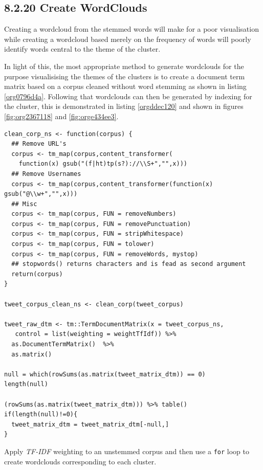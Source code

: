 \documentclass[11pt]{article}
\begin{document}
\subsection{8.2.20 Create WordClouds}
\label{sec:org598ae54}
Creating a wordcloud from the stemmed words will make for a poor visualisation
while creating a wordcloud based merely on the frequency of words will poorly
identify words central to the theme of the cluster.

In light of this, the most appropriate method to generate wordclouds for the
purpose visualisising the themes of the clusters is to create a document term
matrix based on a corpus cleaned without word stemming as shown in listing \ref{org0796d4a}.
Following that wordclouds can then be generated by indexing for the cluster,
this is demonstrated in listing \ref{orgddec120} and shown in figures \ref{fig:org2367118} and \ref{fig:orge434ee3}.


\begin{listing}[htbp]
\begin{verbatim}
clean_corp_ns <- function(corpus) {
  ## Remove URL's
  corpus <- tm_map(corpus,content_transformer(
    function(x) gsub("(f|ht)tp(s?)://\\S+","",x)))
  ## Remove Usernames
  corpus <- tm_map(corpus,content_transformer(function(x) gsub("@\\w+","",x)))
  ## Misc
  corpus <- tm_map(corpus, FUN = removeNumbers)
  corpus <- tm_map(corpus, FUN = removePunctuation)
  corpus <- tm_map(corpus, FUN = stripWhitespace)
  corpus <- tm_map(corpus, FUN = tolower)
  corpus <- tm_map(corpus, FUN = removeWords, mystop)
  ## stopwords() returns characters and is fead as second argument
  return(corpus)
}

tweet_corpus_clean_ns <- clean_corp(tweet_corpus)

tweet_raw_dtm <- tm::TermDocumentMatrix(x = tweet_corpus_ns,
   control = list(weighting = weightTfIdf)) %>%
  as.DocumentTermMatrix()  %>%
  as.matrix()

null = which(rowSums(as.matrix(tweet_matrix_dtm)) == 0)
length(null)

(rowSums(as.matrix(tweet_matrix_dtm))) %>% table()
if(length(null)!=0){
  tweet_matrix_dtm = tweet_matrix_dtm[-null,]
}

\end{verbatim}
\caption{\label{org0796d4a}Apply \emph{TF-IDF} weighting to an unstemmed corpus and then use a \texttt{for} loop to create wordclouds corresponding to each cluster.}
\end{listing}
\end{document}
